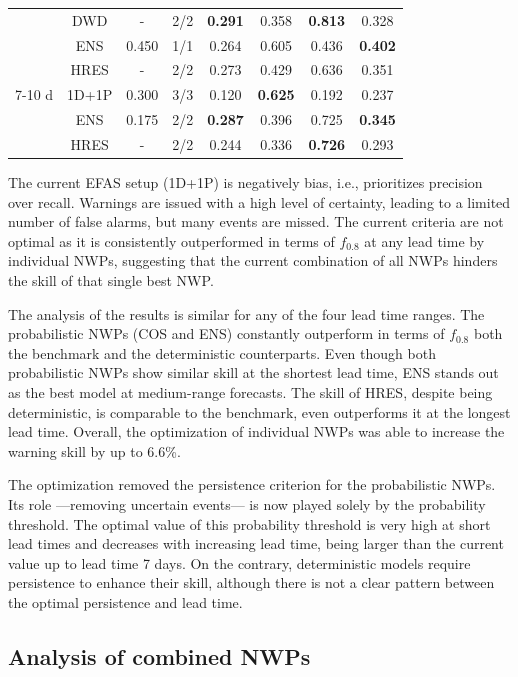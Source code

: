 \documentclass{ametsocV6.1}
\begin{document}
\begin{table}
\begin{tabular}{cccccccc}
         & DWD & - & 2/2 & \textbf{0.291} & 0.358 & \textbf{0.813} & 0.328 \\
         & ENS & 0.450 & 1/1 & 0.264 & 0.605 & 0.436 & \textbf{0.402} \\
         & HRES & - & 2/2 & 0.273 & 0.429 & 0.636 & 0.351 \\
         \midrule
        7-10 d & 1D+1P & 0.300& 3/3 & 0.120 & \textbf{0.625} & 0.192 & 0.237 \\
         & ENS & 0.175 & 2/2 & \textbf{0.287} & 0.396 & 0.725 & \textbf{0.345} \\
         & HRES & - & 2/2 & 0.244 & 0.336 & \textbf{0.726} & 0.293 \\
         \bottomrule
    \end{tabular}
    \label{tab:NWP_optimization}
\end{table}

The current EFAS setup (1D+1P) is negatively bias, i.e., prioritizes precision over recall. Warnings are issued with a high level of certainty, leading to a limited number of false alarms, but many events are missed. The current criteria are not optimal as it is consistently outperformed in terms of $f_{0.8}$ at any lead time by individual NWPs, suggesting that the current combination of all NWPs hinders the skill of that single best NWP.

The analysis of the results is similar for any of the four lead time ranges. The probabilistic NWPs (COS and ENS) constantly outperform in terms of $f_{0.8}$ both the benchmark and the deterministic counterparts. Even though both probabilistic NWPs show similar skill at the shortest lead time, ENS stands out as the best model at medium-range forecasts. The skill of HRES, despite being deterministic, is comparable to the benchmark, even outperforms it at the longest lead time. Overall, the optimization of individual NWPs was able to increase the warning skill by up to 6.6\%.

The optimization removed the persistence criterion for the probabilistic NWPs. Its role  —removing uncertain events— is now played solely by the probability threshold. The optimal value of this probability threshold is very high at short lead times and decreases with increasing lead time, being larger than the current value up to lead time 7 days. On the contrary, deterministic models require persistence to enhance their skill, although there is not a clear pattern between the optimal persistence and lead time.

\subsection{Analysis of combined NWPs}
\label{sec:results_COMB}
\end{document}
